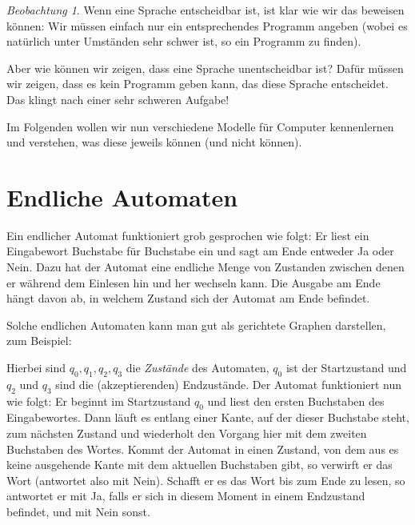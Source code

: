 \documentclass[a4paper,ngerman,12pt]{scrartcl}
\theoremstyle{definition}
\theoremstyle{plain}
\theoremstyle{remark}
\newtheorem{beob}[defn]{Beobachtung}
\begin{document}
\begin{beob}
	Wenn eine Sprache entscheidbar ist, ist klar wie wir das beweisen können: Wir müssen einfach nur ein entsprechendes Programm angeben (wobei es natürlich unter Umständen sehr schwer ist, so ein Programm zu finden).
	
	Aber wie können wir zeigen, dass eine Sprache unentscheidbar ist? Dafür müssen wir zeigen, dass es kein Programm geben kann, das diese Sprache entscheidet. Das klingt nach einer sehr schweren Aufgabe!
\end{beob}

Im Folgenden wollen wir nun verschiedene Modelle für Computer kennenlernen und verstehen, was diese jeweils können (und nicht können).

\section{Endliche Automaten}

Ein endlicher Automat funktioniert grob gesprochen wie folgt: Er liest ein Eingabewort Buchstabe für Buchstabe ein und sagt am Ende entweder Ja oder Nein. Dazu hat der Automat eine endliche Menge von Zustanden zwischen denen er während dem Einlesen hin und her wechseln kann. Die Ausgabe am Ende hängt davon ab, in welchem Zustand sich der Automat am Ende befindet.

Solche endlichen Automaten kann man gut als gerichtete Graphen darstellen, zum Beispiel:
\begin{center}
\end{center}

Hierbei sind $q_0, q_1, q_2, q_3$ die \emph{Zustände} des Automaten, $q_0$ ist der Startzustand und $q_2$ und $q_3$ sind die (akzeptierenden) Endzustände. Der Automat funktioniert nun wie folgt: Er beginnt im Startzustand $q_0$ und liest den ersten Buchstaben des Eingabewortes. Dann läuft es entlang einer Kante, auf der dieser Buchstabe steht, zum nächsten Zustand und wiederholt den Vorgang hier mit dem zweiten Buchstaben des Wortes. Kommt der Automat in einen Zustand, von dem aus es keine ausgehende Kante mit dem aktuellen Buchstaben gibt, so verwirft er das Wort (antwortet also mit Nein). Schafft er es das Wort bis zum Ende zu lesen, so antwortet er mit Ja, falls er sich in diesem Moment in einem Endzustand befindet, und mit Nein sonst.
\end{document}
